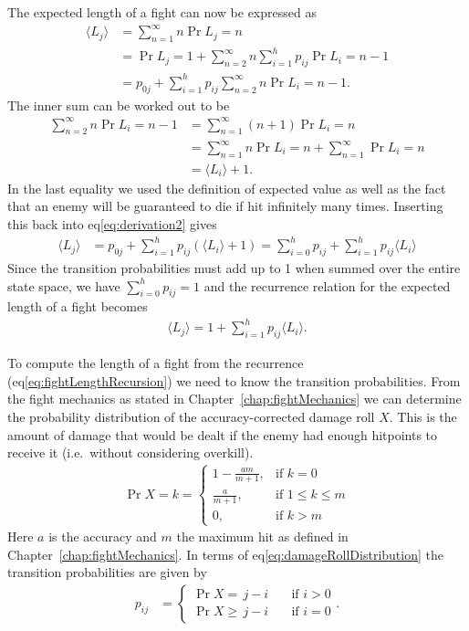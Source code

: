 The expected length of a fight can now be expressed as
\begin{align}
	\langle L_j \rangle &= \sum_{n=1}^{\infty}n\Pr{L_j=n}\nonumber\\
       &= \Pr{L_j=1} + \sum_{n=2}^{\infty}n\sum_{i=1}^h p_{ij} \Pr{L_i=n-1}\nonumber\\
       &= p_{0j} + \sum_{i=1}^h p_{ij} \sum_{n=2}^{\infty}n\Pr{L_i=n-1}.\label{eq:derivation2}
\end{align}
The inner sum can be worked out to be
\begin{align}
    \sum_{n=2}^{\infty}n\Pr{L_i=n-1}
       &= \sum_{n=1}^{\infty}(n+1)\Pr{L_i=n} \nonumber\\
	   &= \sum_{n=1}^{\infty}n\Pr{L_i=n} + \sum_{n=1}^{\infty}\Pr{L_i=n}\nonumber\\
	   &= \langle L_i \rangle + 1.
\end{align}
In the last equality we used the definition of expected value as well as the fact that an enemy will be guaranteed to die if hit infinitely many times. Inserting this back into eq\ref{eq:derivation2} gives
\begin{align}
    \langle L_j \rangle
        &= p_{0j} + \sum_{i=1}^h p_{ij}(\langle L_i \rangle+1)
        = \sum_{i=0}^h p_{ij} + \sum_{i=1}^h p_{ij}\langle L_i \rangle
\end{align}
Since the transition probabilities must add up to 1 when summed over the entire state space, we have $\sum_{i=0}^{h}p_{ij} = 1$ and the recurrence relation for the expected length of a fight becomes
\begin{align}
	\langle L_j \rangle
		= 1 + \sum_{i=1}^h p_{ij}\langle L_i \rangle.
	\label{eq:fightLengthRecursion}
\end{align}

To compute the length of a fight from the recurrence (eq\ref{eq:fightLengthRecursion}) we need to know the transition probabilities. From the fight mechanics as stated in Chapter~\ref{chap:fightMechanics} we can determine the probability distribution of the accuracy-corrected damage roll $X$. This is the amount of damage that would be dealt if the enemy had enough hitpoints to receive it (i.e.\ without considering overkill).
\begin{align}
	\Pr{X = k} =
	\begin{cases}
		1 - \frac{am}{m+1}, &\mbox{if } k = 0 \\
		\frac{a}{m+1},      &\mbox{if }1 \leq k \leq m\\
		0,      			&\mbox{if }k > m
	\end{cases}\label{eq:damageRollDistribution}
\end{align}
Here $a$ is the accuracy and $m$ the maximum hit as defined in Chapter~\ref{chap:fightMechanics}. In terms of eq\ref{eq:damageRollDistribution} the transition probabilities are given by
\begin{align}
    p_{ij}
         &= \begin{cases}
            \Pr{X=\,j-i} \quad &\mbox{if } i > 0 \\
            \Pr{X\geq\,j-i} \quad &\mbox{if } i = 0
        \end{cases}\label{eq:noregenProb}.
\end{align}

